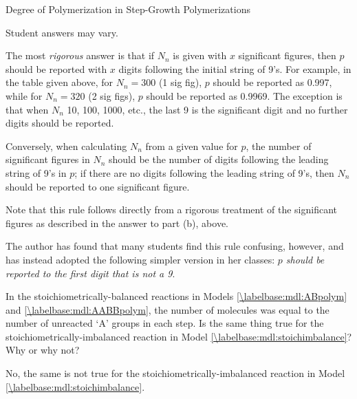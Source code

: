 \begin{activity}{Degree of Polymerization in Step-Growth Polymerizations}
\begin{exercises}
\begin{enumerate}
					\begin{solution}{}
							Student answers may vary.
							
							The most \emph{rigorous} answer is that if $N_n$ is given with $x$ significant figures, then $p$ should be reported with $x$ digits following the initial string of 9's.  For example, in the table given above, for $N_n=300$ (1 sig fig), $p$ should be reported as 0.997, while for $N_n = 320$ (2 sig figs), $p$ should be reported as 0.9969.  The exception is that when $N_n$ 10, 100, 1000, etc., the last 9 is the significant digit and no further digits should be reported.
							
							Conversely, when calculating $N_n$ from a given value for $p$, the number of significant figures in $N_n$ should be the number of digits following the leading string of 9's in $p$; if there are no digits following the leading string of 9's, then $N_n$ should be reported to one significant figure.
							
							Note that this rule follows directly from a rigorous treatment of the significant figures as described in the answer to part (b), above.
							
							The author has found that many students find this rule confusing, however, and has instead adopted the following simpler version in her classes: \emph{$p$ should be reported to the first digit that is not a 9}.
						
					\end{solution}
			\end{enumerate}

		\exercise In the stoichiometrically-balanced reactions in Models \ref{\labelbase:mdl:ABpolym} and \ref{\labelbase:mdl:AABBpolym}, the number of molecules was equal to the number of unreacted `A' groups in each step.  Is the same thing true for the stoichiometrically-imbalanced reaction in Model \ref{\labelbase:mdl:stoichimbalance}? Why or why not? %
		
			\begin{solution}{}
				No, the same is not true for the stoichiometrically-imbalanced reaction in Model \ref{\labelbase:mdl:stoichimbalance}.  
				

\end{solution}
\end{exercises}
\end{activity}

